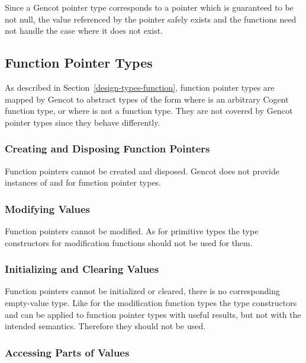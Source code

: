 Since a Gencot pointer type corresponds to a pointer which is guaranteed to be not null, the value referenced by the 
pointer safely exists and the functions need not handle the case where it does not exist.

\subsection{Function Pointer Types}
\label{design-operations-function}

As described in Section~\ref{design-types-function}, function pointer types are mapped by Gencot to abstract types of the form 
 where  is an arbitrary Cogent function type, or  where 
is not a function type. They are not covered by Gencot pointer types since they behave differently.

\subsubsection{Creating and Disposing Function Pointers}

Function pointers cannot be created and disposed. Gencot does not provide instances of  and 
for function pointer types.

\subsubsection{Modifying Values}

Function pointers cannot be modified. As for primitive types the type constructors for modification functions should not be used for them.

\subsubsection{Initializing and Clearing Values}

Function pointers cannot be initialized or cleared, there is no corresponding empty-value type.
Like for the modification function types the type constructors
 and  can be applied to function pointer types with useful results, but not with the intended semantics.
Therefore they should not be used.

\subsubsection{Accessing Parts of Values}

